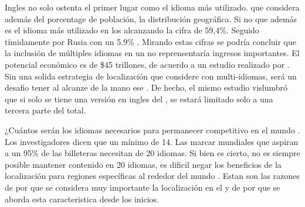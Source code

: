 Ingles no solo ostenta el primer lugar como el idioma más utilizado. \rankingCPT que considera además del porcentage de población, la distribución geográfica. Si no que además es el idioma más utilizado en los \websitesINT alcanzando la cifra de 59,4\%. Seguido tímidamente por Rusia con un 5.9\% \cite{online_world_wide_languages}. Mirando estas cifras se podría concluir que la inclusión de múltiples idiomas en un \siteINT \ecommerceCOM	no reprensentaría ingresos importantes.
El potencial económico \online es de \$45 trillones, de acuerdo a un estudio realizado por \commonSenseAdvisoryNAME \cite{online_world_global_oportunity_multi_languages}.  Sin una solida estrategia de localización que considere \websitesINT \ecommerceCOM con multi-idiomas, será  un desafio tener al alcanze de la mano ese \revenueCOM. De hecho, el mismo estudio vislumbró que si solo se tiene una versión en ingles del  \siteINT, se estará limitado solo a una tercera parte del total.


¿Cuántos serán los idiomas necesarios para permanecer competitivo en el mundo \online. Los investigadores dicen que un mínimo de 14. Las marcar mundiales que aspiran a un 95\% de las billeteras \online necesitan de 20 idiomas. Si bien es cierto, no es siempre posible mantener contenido \online en 20 idiomas, es dificil negar los beneficios de la localización para regiones específicas al rededor del mundo \cite{online_world_global_oportunity_multi_languages}. Estan son las razones de por que se considera muy importante la localización en el \frameworkPC y de por que se aborda esta caracteristica desde los inicios.

